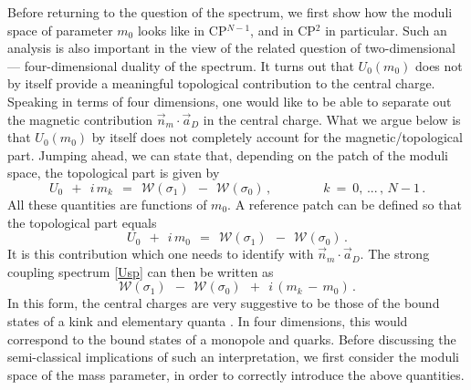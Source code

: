 \documentclass[epsfig,12pt]{article}
\def\beq{\begin{equation}}
\def\eeq{\end{equation}}
\def\beq{\begin{equation}}
\def\eeq{\end{equation}}
\newcommand{\mc}[1]{\mathcal{#1}}
\begin{document}
	Before returning to the question of the spectrum, we first show how the moduli space of parameter
	$ m_0 $ looks like in CP$^{N-1}$, and in CP$^2$ in particular. 
	Such an analysis is also important in the view of the related question of 
	two-dimensional --- four-dimensional duality of the spectrum.
	It turns out that $ U_0(m_0) $ does not by itself provide a meaningful topological contribution
	to the central charge.
	Speaking in terms of four dimensions, one would like to be able to separate out 
	the magnetic contribution $ \vec{n}{}_m \cdot \vec{a}{}_D $ in the central charge.
	What we argue below is that $ U_0(m_0) $ by itself does not completely account for the 
	magnetic/topological part.
	Jumping ahead, we can state that, depending on the patch of the moduli space, 
	the topological part is given by
\beq
	U_0 ~~+~~ i\, m_k ~~=~~ \mc{W}(\sigma_1) ~~-~~ \mc{W}(\sigma_0) \,,
	\qquad\qquad k ~=~ 0,\,...\,,\, N-1\,.
\eeq
	All these quantities are functions of $ m_0 $.
	A reference patch can be defined so that the topological part equals
\beq
	U_0 ~~+~~ i\, m_0 ~~=~~ \mc{W}(\sigma_1) ~~-~~ \mc{W}(\sigma_0) \,.
\eeq
	It is this contribution which one needs to identify with $ \vec{n}{}_m \cdot \vec{a}{}_D $.
	The strong coupling spectrum \eqref{Usp} can then be written as
\beq
	\mc{W}(\sigma_1) ~~-~~ \mc{W}(\sigma_0) ~~+~~ i\, ( m_k \,-\, m_0 )\,.
\eeq
	In this form, the central charges are very suggestive to be those of the bound states 
	of a kink and elementary quanta \cite{Dorey:1999zk}.
	In four dimensions, this would correspond to the bound states of a monopole and quarks.
	Before discussing the semi-classical implications of such an interpretation, we first
	consider the moduli space of the mass parameter, 
	in order to correctly introduce the above quantities.
\end{document}
